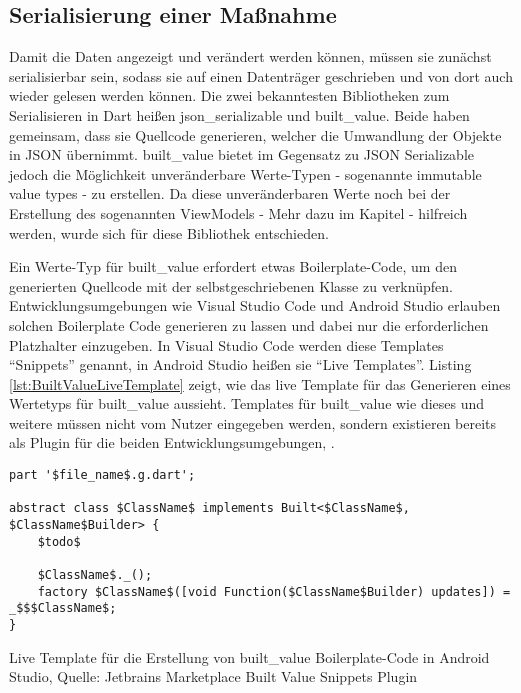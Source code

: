 
\clearpage
\subsection{Serialisierung einer Maßnahme}

Damit die Daten angezeigt und verändert werden können, müssen sie zunächst serialisierbar sein, sodass sie auf einen Datenträger geschrieben und von dort auch wieder gelesen werden können.
Die zwei bekanntesten Bibliotheken zum Serialisieren in Dart heißen json_serializable und built_value.
Beide haben gemeinsam, dass sie Quellcode generieren, welcher die Umwandlung der Objekte in JSON übernimmt.
built_value bietet im Gegensatz zu JSON Serializable jedoch die Möglichkeit unveränderbare Werte-Typen -  sogenannte immutable value types -  zu erstellen. Da diese  unveränderbaren Werte noch bei der Erstellung des sogenannten ViewModels -  Mehr dazu im Kapitel  - hilfreich werden, wurde sich für diese Bibliothek entschieden.

Ein Werte-Typ für built_value erfordert etwas Boilerplate-Code,  um den generierten Quellcode mit der selbstgeschriebenen Klasse zu verknüpfen.
Entwicklungsumgebungen wie Visual Studio Code und Android Studio erlauben solchen Boilerplate Code generieren zu lassen und dabei nur die erforderlichen Platzhalter einzugeben.
In Visual Studio Code werden diese Templates \enquote{Snippets} genannt, in Android Studio heißen sie \enquote{Live Templates}.  Listing \ref{lst:BuiltValueLiveTemplate} zeigt, wie das live Template für das Generieren eines Wertetyps  für built_value aussieht. Templates für built_value wie dieses und weitere müssen nicht vom Nutzer eingegeben werden, sondern existieren bereits als Plugin für die beiden Entwicklungsumgebungen, .


\ifincludeall
  \begin{listing}[h]
    \begin{verbatim}
part '$file_name$.g.dart';

abstract class $ClassName$ implements Built<$ClassName$, $ClassName$Builder> {
    $todo$
    
    $ClassName$._();
    factory $ClassName$([void Function($ClassName$Builder) updates]) = _$$$ClassName$;
}

\end{verbatim}
    \caption[built_value Live Template]{Live Template für die Erstellung von built_value Boilerplate-Code in Android Studio, Quelle: Jetbrains Marketplace Built Value Snippets Plugin}
    \label{lst:BuiltValueLiveTemplate}
  \end{listing}
\fi

